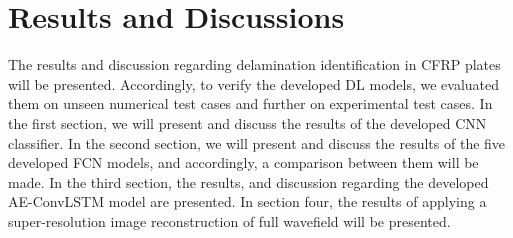 
\chapter[Results and Discussions]{Results and Discussions}
\label{ch5}

The results and discussion regarding delamination identification in CFRP plates will be presented. 
Accordingly, to verify the developed DL models, we evaluated them on unseen numerical test cases and further on experimental test cases.
In the first section, we will present and discuss the results of the developed CNN classifier. 
In the second section, we will present and discuss the results of the five developed FCN models, and accordingly, a comparison between them will be made.
In the third section, the results, and discussion regarding the developed AE-ConvLSTM model are presented.
In section four, the results of applying a super-resolution image reconstruction of full wavefield will be presented. 







